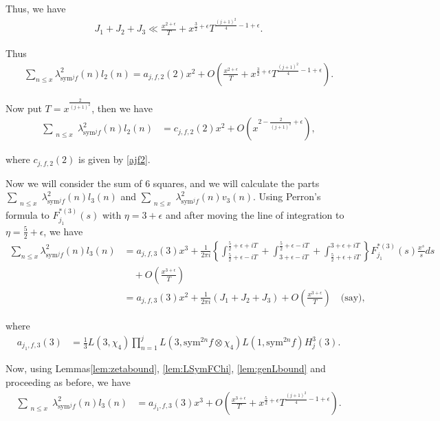 \documentclass[10pt]{amsart}
\begin{document}
Thus, we have \begin{align}
    J_1+J_2+J_3 \ll \frac{x^{2+\epsilon}}{T} + x^{\frac{3}{2}+\epsilon}T^{\frac{(j+1)^2}{4}-1+\epsilon}.
\end{align}

Thus \begin{align}
    \sum_{n\leq x}\lambda_{\mathrm{sym}^{j}f}^2(n)l_2(n) = a_{j,f,2}(2)x^2 + O \left( \frac{x^{2+\epsilon}}{T}+x^{\frac{3}{2}+\epsilon} T^{\frac{(j+1)^2}{4}-1+\epsilon} \right).
\end{align}

Now put $T=x^{\frac{2}{(j+1)^2}}$, then we have \begin{align}
    \sum_{\substack{n\leq x}}\lambda_{\mathrm{sym}^jf}^2(n)l_2(n) &= c_{j,f,2}(2)x^{2} + O \left(x^{2-\frac{2}{(j+1)^2}+\epsilon}\right),
\end{align}

where $c_{j,f,2}(2)$ is given by \eqref{ajf2}.

Now we will consider the sum of $6$ squares, and we will calculate the parts $\sum_{\substack{n\leq x}}\lambda_{\mathrm{sym}^jf}^2(n)l_3(n)$ and $\sum_{\substack{n\leq x}}\lambda_{\mathrm{sym}^jf}^2(n)v_3(n)$. Using Perron's formula to $F_{j_1}^{*(3)}(s)$ with $\eta = 3+\epsilon$ and after moving the line of integration to $\eta = \frac{5}{2}+\epsilon$, we have  
\begin{align}
    \sum_{n\leq x}\lambda_{\mathrm{sym}^{j}f}^2(n)l_3(n) & = a_{j,f,3}(3)x^3+\frac{1}{2\pi i}\left\{\int_{\frac{5}{2}+\epsilon-iT}^{\frac{5}{2}+\epsilon+iT}+\int_{3+\epsilon-iT}^{\frac{5}{2}+\epsilon-iT}+\int_{\frac{5}{2}+\epsilon+iT}^{3+\epsilon+iT}\right\}F_{j_1}^{*(3)}(s)\frac{x^{s}}{s}ds \\
    &\quad + O\left(\frac{x^{3+\epsilon}}{T}\right) \\
    &= a_{j,f,3}(3)x^2+\frac{1}{2\pi i}(J_{1}+J_{2}+J_{3})+O\left(\frac{x^{3+\epsilon}}{T}\right) \quad \text{(say)} ,
\end{align}

where \begin{align} \label{ajf3}
    a_{j_1,f,3}(3) &= \frac{1}{3}L(3,\chi_4)\prod_{n=1}^{j}L(3,\mathrm{sym}^{2n}f \otimes \chi_4)L(1,\mathrm{sym}^{2n}f)H_j^3(3).
\end{align}

Now, using Lemmas\ref{lem:zetabound}, \ref{lem:LSymFChi}, \ref{lem:genLbound} and proceeding as before, we have 
\begin{align} \label{eq:convSuml3}
    \sum_{\substack{n\leq x}}\lambda_{\mathrm{sym}^jf}^2(n)l_3(n) &= a_{j_1,f,3}(3)x^3 + O \left( \frac{x^{3+\epsilon}}{T}+ {x^{\frac{5}{2}+\epsilon}T^{\frac{(j+1)^2}{4}-1+\epsilon}} \right).
\end{align}
\end{document}

